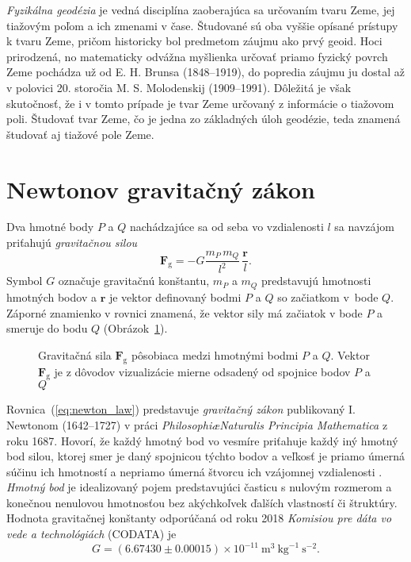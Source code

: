 \documentclass[a4paper, 12pt]{book}
\newcommand{\gidx}{\mathrm g}
\let\vec\mathbf
\begin{document}
\emph{Fyzikálna geodézia} je vedná disciplína zaoberajúca sa určovaním tvaru 
Zeme, jej tiažovým poľom a ich zmenami v čase.  Študované sú oba vyššie opísané 
prístupy k tvaru Zeme, pričom historicky bol predmetom záujmu ako prvý geoid.  
Hoci prirodzená, no matematicky odvážna myšlienka určovať priamo fyzický povrch 
Zeme pochádza už od E. H. Brunsa (1848--1919), do popredia záujmu ju dostal až 
v polovici 20. storočia M. S. Molodenskij (1909--1991).  Dôležitá je však 
skutočnosť, že i v tomto prípade je tvar Zeme určovaný z informácie o tiažovom 
poli.  Študovať tvar Zeme, čo je jedna zo základných úloh geodézie, teda 
znamená študovať aj tiažové pole Zeme.

\section{Newtonov gravitačný zákon}
\label{sec:newton_law}

Dva hmotné body $P$ a $Q$ nachádzajúce sa od seba vo vzdialenosti $l$ sa 
navzájom priťahujú \emph{gravitačnou silou}
%
\begin{equation}
\label{eq:newton_law}
\vec F_\gidx = -G \frac{m_P \, m_Q}{l^2} \, \frac{\vec r}{l}{.}
\end{equation}
%
Symbol $G$ označuje gravitačnú konštantu, $m_P$ a $m_Q$ predstavujú hmotnosti 
hmotných bodov a $\vec r$ je vektor definovaný bodmi $P$ a $Q$ so začiatkom 
v~bode $Q$.  Záporné znamienko v rovnici znamená, že vektor sily má začiatok 
v bode $P$ a smeruje do bodu $Q$ (Obrázok~\ref{fig:newton_law}).

\begin{figure}[b]
\centering

\caption{Gravitačná sila $\vec F_\gidx$ pôsobiaca medzi hmotnými bodmi $P$ 
a $Q$.  Vektor $\vec F_\gidx$ je z dôvodov vizualizácie mierne odsadený od 
spojnice bodov $P$ a $Q$}
\label{fig:newton_law}
\end{figure}

Rovnica~(\ref{eq:newton_law}) predstavuje \emph{gravitačný zákon} 
publikovaný I. Newtonom (1642--1727) v práci \emph{Philosophi\ae Naturalis 
Principia Mathematica} z roku 1687.  Hovorí, že každý hmotný bod vo vesmíre 
priťahuje každý iný hmotný bod silou, ktorej smer je daný spojnicou týchto 
bodov a veľkosť je priamo úmerná súčinu ich hmotností a nepriamo úmerná štvorcu 
ich vzájomnej vzdialenosti \citep{Kellogg1967}.  \emph{Hmotný bod} je 
idealizovaný pojem predstavujúci časticu s nulovým rozmerom a konečnou 
nenulovou hmotnosťou bez akýchkoľvek ďalších vlastností či štruktúry.  Hodnota 
gravitačnej konštanty odporúčaná od roku 2018 \emph{Komisiou pre dáta vo vede 
a technológiách} (CODATA) je
%
\begin{equation}
G = (6.67430 \pm 0.00015) \times 10^{-11} \ \mathrm{m}^3 \ \mathrm{kg}^{-1} 
\ \mathrm{s}^{-2}{.}
\end{equation}
\end{document}
